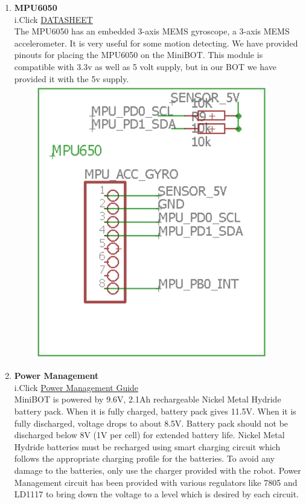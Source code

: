 \documentclass[a4paper,12pt,oneside]{book}
\begin{document}
\begin{enumerate}
    \newpage\item \textbf{MPU6050}\\
    i.Click \href{https://www.invensense.com/wp-content/uploads/2015/02/MPU-6000-Datasheet1.pdf}{DATASHEET}
    \\[0.5cm]The MPU6050 has an embedded 3-axis MEMS gyroscope, a 3-axis MEMS accelerometer. It is very useful for some motion detecting. We have provided pinouts for placing the MPU6050 on the MiniBOT. This module is compatible with 3.3v as well as 5 volt supply, but in our BOT we have provided it with the 5v supply.
    \vspace*{1.5cm}
    \\\hspace*{.5cm}\includegraphics[width=12cm, height=12cm]{Mpu6050}
    
    \newpage\item \textbf{Power Management}\\
    i.Click \href{http://www.ti.com/lit/sg/slvt145q/slvt145q.pdf}{Power Management Guide}
    \\[0.5cm]MiniBOT is powered by 9.6V, 2.1Ah rechargeable Nickel Metal Hydride battery pack. When it is fully charged, battery pack gives 11.5V. When it is fully discharged, voltage drops to about 8.5V. Battery pack should not be discharged below 8V (1V per cell) for extended battery life. Nickel Metal Hydride batteries must be recharged using smart charging circuit which follows the appropriate charging profile for the batteries. To avoid any damage to the batteries, only use the charger provided with the robot. 
    Power Management circuit has been provided with various regulators like 7805 and LD1117 to bring down the voltage to a level which is desired by each circuit.
    

\end{enumerate}
\end{document}
